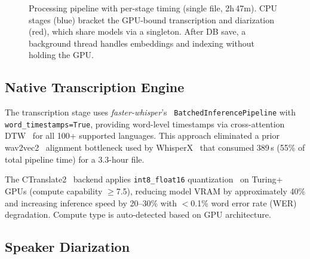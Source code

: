 \documentclass[conference,10pt]{IEEEtran}
\begin{document}
\begin{figure}[!t]
\caption{Processing pipeline with per-stage timing (single file, 2h\,47m).
  CPU stages (blue) bracket the GPU-bound transcription and diarization (red),
  which share models via a singleton. After DB save, a background thread
  handles embeddings and indexing without holding the GPU.}
\label{fig:pipeline}
\end{figure}

\subsection{Native Transcription Engine}

The transcription stage uses \textit{faster-whisper}'s~\cite{fasterwhisper2023}
\texttt{Batched\-Inference\-Pipeline} with \texttt{word\_timestamps=True},
providing word-level timestamps via cross-attention DTW~\cite{radford2023whisper}
for all 100+ supported languages. This approach eliminated a prior
wav2vec2~\cite{baevski2020wav2vec} alignment bottleneck used by
WhisperX~\cite{bain2023whisperx} that consumed 389\,s (55\% of total pipeline
time) for a 3.3-hour file.

The CTranslate2~\cite{ctranslate2_2023} backend applies \texttt{int8\_float16}
quantization~\cite{micikevicius2018mixed} on Turing+
GPUs (compute capability $\geq$7.5), reducing model VRAM by approximately 40\%
and increasing inference speed by 20--30\% with $<$0.1\% word error rate (WER)
degradation. Compute type is auto-detected based on GPU architecture.

\subsection{Speaker Diarization}
\end{document}
